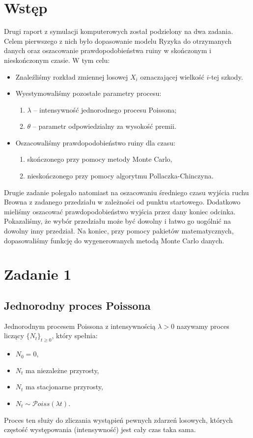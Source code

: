 \documentclass[12pt]{mwart}
\begin{document}
	\section{Wstęp}
	\noindent Drugi raport z symulacji komputerowych został podzielony na dwa zadania. Celem pierwszego z nich było dopasowanie modelu Ryzyka do otrzymanych danych oraz oszacowanie prawdopodobieństwa ruiny w skończonym i nieskończonym czasie. W tym celu:
	\begin{itemize}[leftmargin=10mm, label=\small$\bullet$]
		\item Znaleźliśmy rozkład zmiennej losowej $X_i$ oznaczającej wielkość $i$-tej szkody.
		\item Wyestymowaliśmy pozostałe parametry procesu:
		\begin{enumerate}[leftmargin=10mm]
			\item $\lambda$ -- intensywność jednorodnego procesu Poissona;
			\item $\theta$ -- parametr odpowiedzialny za wysokość premii.
		\end{enumerate}
		\item Oszacowaliśmy prawdopodobieństwo ruiny dla czasu:
		\begin{enumerate}[leftmargin=10mm]
			\item skończonego przy pomocy metody Monte Carlo,
			\item nieskończonego przy pomocy algorytmu Pollaczka-Chinczyna.
		\end{enumerate}
	\end{itemize}
	\noindent Drugie zadanie polegało natomiast na oszacowaniu średniego czasu wyjścia ruchu Browna z zadanego przedziału w zależności od punktu startowego. Dodatkowo mieliśmy oszacować prawdopodobieństwo wyjścia przez dany koniec odcinka. Pokazaliśmy, że wybór przedziału może być dowolny i łatwo go uogólnić na dowolny inny przedział. Na koniec, przy pomocy pakietów matematycznych, dopasowaliśmy funkcję do wygenerowanych metodą Monte Carlo danych.
	
	
	
	\section{Zadanie 1}

	\subsection{Jednorodny proces Poissona}
	
	\noindent Jednorodnym procesem Poissona z intensywnością $\lambda > 0$ nazywamy proces liczący $\{N_t\}_{t \geq 0}$, który spełnia:
	\begin{itemize}[leftmargin=10mm, label={\small$\bullet$}]
		\item $N_0 = 0$,
		\item $N_t$ ma niezależne przyrosty,
		\item $N_t$ ma stacjonarne przyrosty,
		\item $N_t \sim \mathcal{P}oiss(\lambda t)$.
	\end{itemize}
	Proces ten służy do zliczania wystąpień pewnych zdarzeń losowych, których częstość występowania (intensywność) jest cały czas taka sama.\\
	
\end{document}
